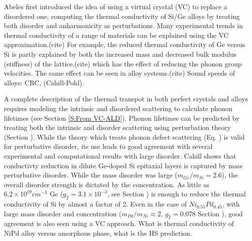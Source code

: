 \documentclass[aps,prb,twocolumn,superscriptaddress,amsmath,amssymb,floatfix]{revtex4}
\begin{document}
Abeles first introduced the idea of using a virtual crystal (VC) to 
replace a disordered one, computing the
thermal conductivity of Si/Ge alloys by treating both
disorder and anharmonicity as perturbations.\cite{abeles_lattice_1963} 
Many experimental trends in thermal conductivity 
of a range of materials 
can be explained using the VC approximation.(cite) For example,
the reduced thermal conductivity of Ge versus Si is partly explained 
by both the increased mass and decreased bulk modulus (stiffness) of the 
lattice,(cite) which has the effect of reducing the phonon group 
velocities. The same effect can be seen in alloy systems.(cite)
Sound speeds of alloys: CRC, (Cahill-Pohl).

A complete 
description of the thermal transpot in both perfect crystals and alloys 
requires modeling the intrinsic 
and disordered scattering to calculate phonon lifetimes 
(see Section \ref{S:From VC-ALD}).
Phonon lifetimes can be predicted by treating both the intrinsic 
and disorder scattering using perturbation theory (Section ). 
While the theory which treats phonon defect scattering (Eq. ) 
is valid for
perturbative disorder, its use leads to good agreement with
several experimental and computational results with large disorder.  
Cahill shows that conductivty reduction in dilute 
Ge-doped Si epitaxial layers 
is captured by mass perturbative disorder.
\cite{cahill_thermal_2004,cahill_thermal_2005} 
While the mass disorder was large ($m_{Ge}/m_{Si} = 2.6$),  
the overall disorder strength is dictated by the concentration. 
As little as $6.2\times10^{19} cm^{-3}$ Ge
($g_2 = 3.1\times10^{-3}$, see Section ) 
is enough to reduce the thermal conductivity of 
Si by almost a factor of 2.\cite{cahill_thermal_2004}
Even in the
case of $Ni_{0.55}Pd_{0.45}$, with large mass disorder and 
concentration ($m_{Pd}/m_{Ni} \approx 2$, $g_2=0.078$ Section ), 
good agreement is also seen using a VC approach.
\cite{kamitakahara_vibrations_1974} What is thermal conductivity 
of NiPd alloy versus amorphous phase, what is the HS prediction.
\end{document}
